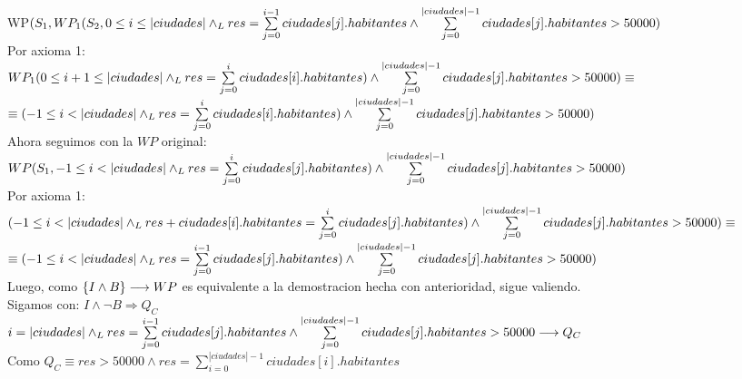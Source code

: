 \documentclass[10pt,a4paper]{article}
\begin{document}
\vspace{0.1cm}

WP$(S_1, WP_1(S_2, 0 \leq i \leq |ciudades| \land _L res = \sum\limits_{j=0}^{i-1} ciudades[j].habitantes \land \sum\limits_{j=0}^{|ciudades| -1} ciudades[j].habitantes > 50000)$ \\

Por axioma 1: \\

$WP_1(0 \leq i+1 \leq |ciudades| \land _L res = \sum\limits_{j=0}^{i} ciudades[i].habitantes) \land \sum\limits_{j=0}^{|ciudades| -1} ciudades[j].habitantes > 50000) \equiv $ \\


$\equiv (-1 \leq i < |ciudades| \land _L res = \sum\limits_{j=0}^{i} ciudades[i].habitantes) \land \sum\limits_{j=0}^{|ciudades| -1} ciudades[j].habitantes > 50000)$\\

Ahora seguimos con la $WP$ original: \\

$WP(S_1, -1 \leq i < |ciudades| \land _L res = \sum\limits_{j=0}^{i} ciudades[j].habitantes) \land \sum\limits_{j=0}^{|ciudades| -1} ciudades[j].habitantes > 50000)$ \\

Por axioma 1: \\

$(-1 \leq i < |ciudades| \land _L res + ciudades[i].habitantes = \sum\limits_{j=0}^{i} ciudades[j].habitantes) \land \sum\limits_{j=0}^{|ciudades| -1} ciudades[j].habitantes > 50000) \equiv $ \\

$\equiv (-1 \leq i < |ciudades| \land _L res = \sum\limits_{j=0}^{i-1} ciudades[j].habitantes) \land \sum\limits_{j=0}^{|ciudades| -1} ciudades[j].habitantes > 50000)$ \\

Luego, como $\left\{I \wedge B\right\} \longrightarrow WP$ es equivalente a la demostracion hecha con anterioridad, sigue valiendo.\\

Sigamos con: $I \wedge \neg B \Rightarrow Q_C$\\

$i = |ciudades| \land _L res = \sum\limits_{j=0}^{i-1} ciudades[j].habitantes \land \sum\limits_{j=0}^{|ciudades| -1} ciudades[j].habitantes > 50000 \longrightarrow Q_C$ \\

Como $Q_C \equiv res > 50000 \land res = \sum\limits_{i=0}^{|ciudades|-1} ciudades[i].habitantes $
\end{document}
